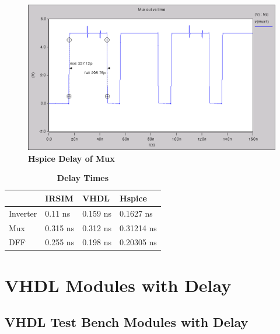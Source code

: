 \documentclass[a4paper]{article}
\begin{document}
    \begin{figure}[H]
        \centering
        \includegraphics[width=\textwidth,height=\textheight,keepaspectratio]{../../cscope/mux1_delay.png}
        \caption{\textbf{Hspice Delay of Mux}}
        \label{fig:gg}
    \end{figure}

    \begin{table}[H]
        \centering
        \begin{tabular}{l | l | l | l}
            \hline
            &  \textbf{IRSIM}   & \textbf{VHDL} & \textbf{Hspice}\\ \hline
            \midrule
                Inverter    & 0.11 ns & 0.159 ns & 0.1627 ns \\
                Mux         & 0.315 ns & 0.312 ns &  0.31214 ns \\
                DFF         & 0.255 ns & 0.198 ns & 0.20305 ns \\
        \end{tabular}
        \caption{\textbf{Delay Times}}
    \end{table}

    \newpage

\section{\textbf{VHDL Modules with Delay}}

    
    
    

\subsection{\textbf{VHDL Test Bench Modules with Delay}}
    
    
\end{document}

